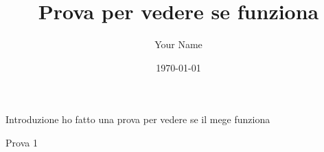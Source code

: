 \documentclass[a4paper,12pt]{book}
\title{Prova per vedere se funziona}
\author{Your Name}
\date{\today}
\begin{document}
 
\begin{chapter}{Introduzione}
ho fatto una prova per vedere se il mege funziona
\end{chapter}

\begin{section}{Prova 1}

    \end{section}
\end{document}
